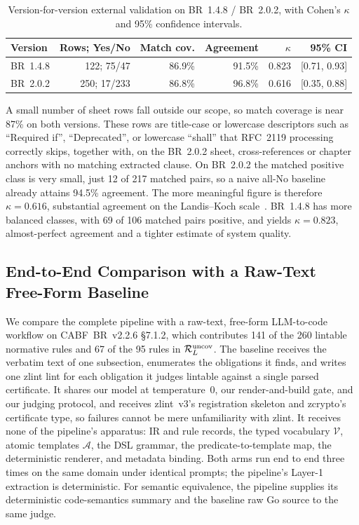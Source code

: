 \begin{table}[tb]
\centering
\scriptsize
\setlength{\tabcolsep}{3pt}
\caption{Version-for-version external validation on BR~1.4.8 / BR~2.0.2, with
Cohen's $\kappa$ and 95\% confidence intervals.}
\label{tab:extval}
\begin{tabular*}{\columnwidth}{@{\extracolsep{\fill}}lrrrrr@{}}
\toprule
Version & Rows; Yes/No & Match cov. & Agreement & $\kappa$ & 95\% CI \\
\midrule
BR~1.4.8 & 122; 75/47 & 86.9\% & 91.5\% & 0.823 & [0.71, 0.93] \\
BR~2.0.2 & 250; 17/233 & 86.8\% & 96.8\% & 0.616 & [0.35, 0.88] \\
\bottomrule
\end{tabular*}
\end{table}

A small number of sheet rows fall outside our scope, so match coverage is near
87\% on both versions. These rows are title-case or lowercase descriptors such as
``Required if'', ``Deprecated'', or lowercase ``shall'' that RFC~2119 processing
correctly skips, together with, on the BR~2.0.2 sheet, cross-references or chapter
anchors with no matching extracted clause. On BR~2.0.2 the matched positive class is
very small, just 12 of 217 matched pairs, so a naive all-No baseline
already attains 94.5\% agreement. The more meaningful figure is therefore
$\kappa = 0.616$, substantial agreement on the Landis--Koch
scale~\cite{landis1977measurement}. BR~1.4.8 has more balanced classes, with 69
of 106 matched pairs positive, and yields $\kappa = 0.823$,
almost-perfect agreement and a tighter estimate of system quality.

\subsection{End-to-End Comparison with a Raw-Text Free-Form Baseline}
\label{subsec:baseline}

We compare the complete pipeline with a raw-text, free-form LLM-to-code workflow
on CABF~BR~v2.2.6 \S7.1.2, which contributes 141 of the 260 lintable normative
rules and 67 of the 95 rules in $\mathcal{R}_L^{\mathrm{uncov}}$. The baseline receives the verbatim text
of one subsection, enumerates the obligations it finds, and writes one zlint lint
for each obligation it judges lintable against a single parsed certificate. It
shares our model at temperature~0, our render-and-build gate, and our judging
protocol, and receives zlint~v3's registration skeleton and zcrypto's certificate
type, so failures cannot be mere unfamiliarity with zlint. It receives none of
the pipeline's apparatus: IR and rule records, the typed vocabulary $\mathcal{V}$,
atomic templates $\mathcal{A}$, the DSL grammar, the predicate-to-template map,
the deterministic renderer, and metadata binding. Both arms run end to end three
times on the same domain under identical prompts; the pipeline's Layer-1
extraction is deterministic. For semantic equivalence, the pipeline supplies its
deterministic code-semantics summary and the baseline raw Go source to the same
judge.

